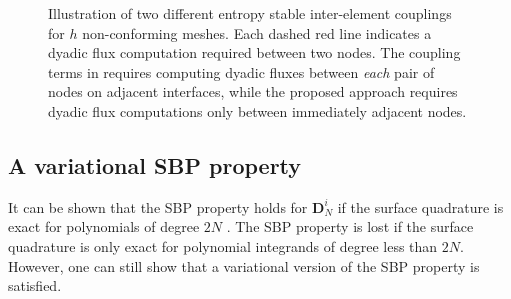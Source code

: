 \documentclass[preprint,10pt]{elsarticle}
\theoremstyle{definition}
\theoremstyle{lemma}
\theoremstyle{corollary}
\theoremstyle{theorem}
\theoremstyle{assumption}
\begin{document}
\begin{figure}[!h]
\centering
\begingroup
\captionsetup[subfigure]{width=.425\textwidth}
\hspace{2em}
\endgroup
\caption{Illustration of two different entropy stable inter-element couplings for $h$ non-conforming meshes.  Each dashed red line indicates a dyadic flux computation required between two nodes.  The coupling terms in \cite{friedrich2017entropy} requires computing dyadic fluxes between \emph{each} pair of nodes on adjacent interfaces, while the proposed approach requires dyadic flux computations only between immediately adjacent nodes.   }
\label{fig:noncon}
\end{figure}


\subsection{A variational SBP property}

It can be shown that the SBP property holds for $\bm{D}^i_N$ if the surface quadrature is exact for polynomials of degree $2N$ \cite{chan2017discretely}.  The SBP property is lost if the surface quadrature is only exact for polynomial integrands of degree less than $2N$.  However, one can still show that a variational version of the SBP property is satisfied.  
\end{document}
